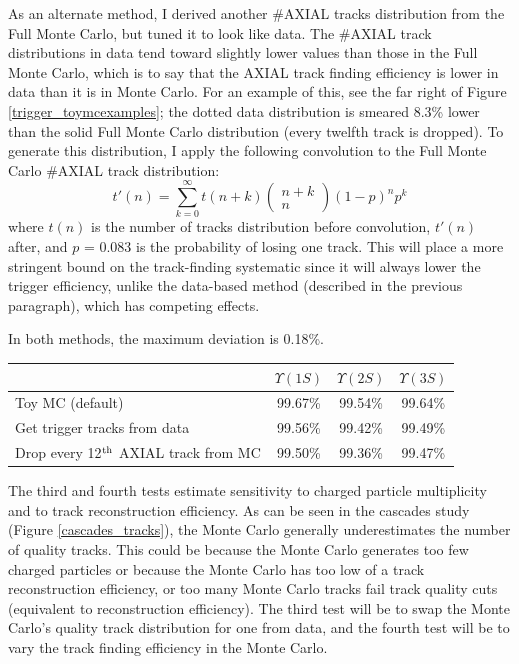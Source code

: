 As an alternate method, I derived another \#AXIAL tracks distribution
from the Full Monte Carlo, but tuned it to look like data.  The
\#AXIAL track distributions in data tend toward slightly lower values
than those in the Full Monte Carlo, which is to say that the AXIAL
track finding efficiency is lower in data than it is in Monte Carlo.
For an example of this, see the far right of Figure
\ref{trigger_toymcexamples}; the dotted data distribution is smeared
8.3\% lower than the solid Full Monte Carlo distribution (every
twelfth track is dropped).  To generate this distribution, I apply the
following convolution to the Full Monte Carlo \#AXIAL track
distribution:
\begin{equation}
  t'(n) = \sum_{k=0}^\infty t(n+k)
  \left(\begin{array}{c} n+k \\ n
  \end{array}\right) (1 - p)^n p^k
  \label{trigger_trackconvolutioneqn}
\end{equation}
where $t(n)$ is the number of tracks distribution before convolution,
$t'(n)$ after, and $p$ = 0.083 is the probability of losing one track.
This will place a more stringent bound on the track-finding systematic
since it will always lower the trigger efficiency, unlike the
data-based method (described in the previous paragraph), which has
competing effects.

In both methods, the maximum deviation is 0.18\%.
\begin{center}
  \begin{tabular}{l c c c}
    & $\Upsilon(1S)$ & $\Upsilon(2S)$ & $\Upsilon(3S)$ \\\hline
    Toy MC (default) & 99.67\% & 99.54\% & 99.64\% \\
    Get trigger tracks from data & 99.56\% & 99.42\% & 99.49\% \\
    Drop every 12$^{\mbox{\scriptsize th}}$ AXIAL track from MC & 99.50\% & 99.36\% & 99.47\%
  \end{tabular}
\end{center}

The third and fourth tests estimate sensitivity to charged particle
multiplicity and to track reconstruction efficiency.  As can be seen
in the cascades study (Figure \ref{cascades_tracks}), the Monte Carlo
generally underestimates the number of quality tracks.  This could be
because the Monte Carlo generates too few charged particles or because
the Monte Carlo has too low of a track reconstruction efficiency, or
too many Monte Carlo tracks fail track quality cuts (equivalent to
reconstruction efficiency).  The third test will be to swap the Monte
Carlo's quality track distribution for one from data, and the fourth
test will be to vary the track finding efficiency in the Monte Carlo.

